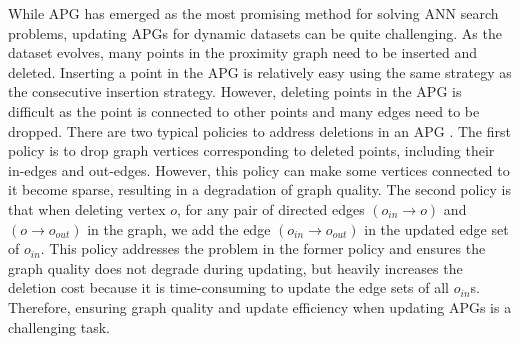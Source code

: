 \documentclass[11pt]{article}
\newcommand{\ie}{\emph{i.e.,}\xspace}
\def\ie{\emph{i.e.,}\xspace}
\begin{document}
While APG has emerged as the most promising method for solving ANN search problems, updating APGs for dynamic datasets can be quite challenging. As the dataset evolves, many points in the proximity graph need to be inserted and deleted. Inserting a point in the APG is relatively easy using the same strategy as the consecutive insertion strategy. However, deleting points in the APG is difficult as the point is connected to other points and many edges need to be dropped. There are two typical policies to address deletions in an APG \cite{DBLP:journals/corr/abs-2105-09613}. The first policy is to drop graph vertices corresponding to deleted points, including their in-edges and out-edges. However, this policy can make some vertices connected to it become sparse, resulting in a degradation of graph quality. The second policy is that when deleting vertex $o$, for any pair of directed edges $(o_{in}\to o)$ and $(o\to o_{out})$ in the graph, we add the edge $(o_{in}\to o_{out})$ in the updated edge set of $o_{in}$. This policy addresses the problem in the former policy and ensures the graph quality does not degrade during updating, but heavily increases the deletion cost because it is time-consuming to update the edge sets of all $o_{in}$s. Therefore, ensuring graph quality and update efficiency when updating APGs is a challenging task.
\end{document}
